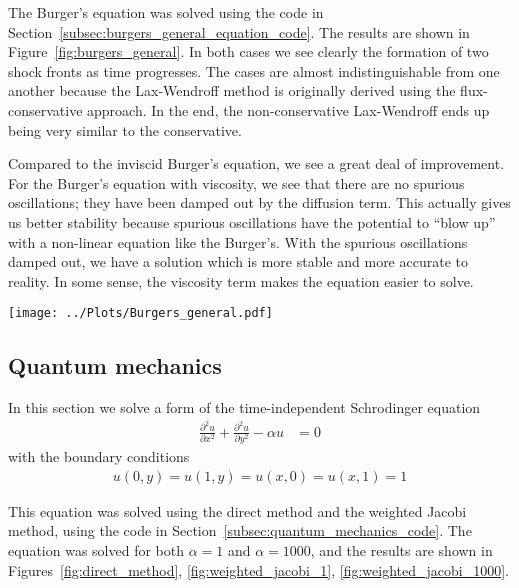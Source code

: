 \documentclass[twocolumn]{myarticle}
\begin{document}
The Burger's equation was solved using the code in Section~\ref{subsec:burgers_general_equation_code}.
The results are shown in Figure~\ref{fig:burgers_general}.
In both cases we see clearly the formation of two shock fronts as time progresses.
The cases are almost indistinguishable from one another because the Lax-Wendroff method is originally derived using the flux-conservative approach.
In the end, the non-conservative Lax-Wendroff ends up being very similar to the conservative.

Compared to the inviscid Burger's equation, we see a great deal of improvement.
For the Burger's equation with viscosity, we see that there are no spurious oscillations; they have been damped out by the diffusion term.
This actually gives us better stability because spurious oscillations have the potential to ``blow up'' with a non-linear equation like the Burger's.
With the spurious oscillations damped out, we have a solution which is more stable and more accurate to reality.
In some sense, the viscosity term makes the equation easier to solve.

\begin{figure*}[ht]
    \centering
    \texttt{[image: ../Plots/Burgers\_general.pdf]}
    \caption{Solutions to the general Burger's equation using the Lax Wendroff method.}
    \label{fig:burgers_general}
\end{figure*}


\subsection{Quantum mechanics}
\label{subsec:quantum_mechanics}

In this section we solve a form of the time-independent Schrodinger equation
\begin{align}
    \frac{\partial^2 u}{\partial x^2} + \frac{\partial^2 u}{\partial y^2} - \alpha u &= 0
\end{align}
with the boundary conditions
\begin{align}
    u(0,y) = u(1, y) = u(x, 0) = u(x, 1) = 1
\end{align}

This equation was solved using the direct method and the weighted Jacobi method, using the code in Section~\ref{subsec:quantum_mechanics_code}.
The equation was solved for both $ \alpha = 1 $ and $ \alpha = 1000 $, and the results are shown in Figures~\ref{fig:direct_method}, \ref{fig:weighted_jacobi_1}, \ref{fig:weighted_jacobi_1000}.
\end{document}
